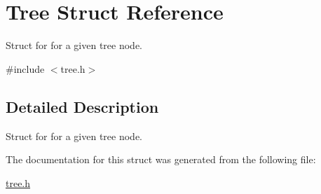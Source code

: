 \hypertarget{structTree}{}\section{Tree Struct Reference}
\label{structTree}


Struct for for a given tree node.  




{\ttfamily \#include $<$tree.\+h$>$}



\subsection{Detailed Description}
Struct for for a given tree node. 

The documentation for this struct was generated from the following file\+:\begin{DoxyCompactItemize}
\item 
\hyperlink{tree_8h}{tree.\+h}\end{DoxyCompactItemize}
